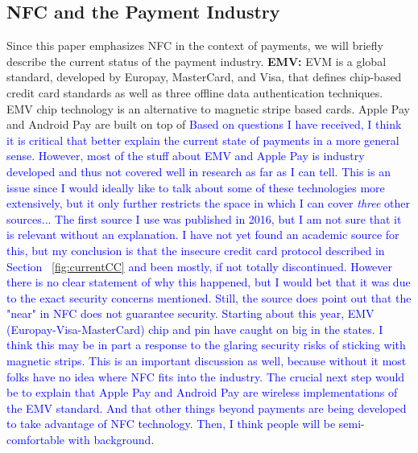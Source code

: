 \documentclass{sig-alternate}
\begin{document}
\subsection{NFC and the Payment Industry}
\label{sec:paymentIndustry}
Since this paper emphasizes NFC in the context of payments, we will briefly describe the current status of the payment industry.
\vspace{2mm}\newline
\textbf{EMV:}
EVM is a global standard, developed by Europay, MasterCard, and Visa, that defines chip-based credit card standards as well as three offline data authentication techniques.~\cite{Ticket2011} EMV chip technology is an alternative to magnetic stripe based cards. Apple Pay and Android Pay are built on top of  
\textcolor{blue}{Based on questions I have received, I think it is critical that better explain the current state of payments in a more general sense. However, most of the stuff about EMV and Apple Pay is industry developed and thus not covered well in research as far as I can tell. This is an issue since I would ideally like to talk about some of these technologies more extensively, but it only further restricts the space in which I can cover \textit{three} other sources...\newline
The first source I use was published in 2016, but I am not sure that it is relevant without an explanation. I have not yet found an academic source for this, but my conclusion is that the insecure credit card protocol described in Section ~\ref{fig:currentCC} and been mostly, if not totally discontinued. However there is no clear statement of why this happened, but I would bet that it was due to the exact security concerns mentioned. Still, the source does point out that the "near" in NFC does not guarantee security.\newline
Starting about this year, EMV (Europay-Visa-MasterCard) chip and pin have caught on big in the states. I think this may be in part a response to the glaring security risks of sticking with magnetic strips. This is an important discussion as well, because without it most folks have no idea where NFC fits into the industry. \newline
The crucial next step would be to explain that Apple Pay and Android Pay are wireless implementations of the EMV standard. And that other things beyond payments are being developed to take advantage of NFC technology. Then, I think people will be semi-comfortable with background.}~\cite{wired}
\end{document}
